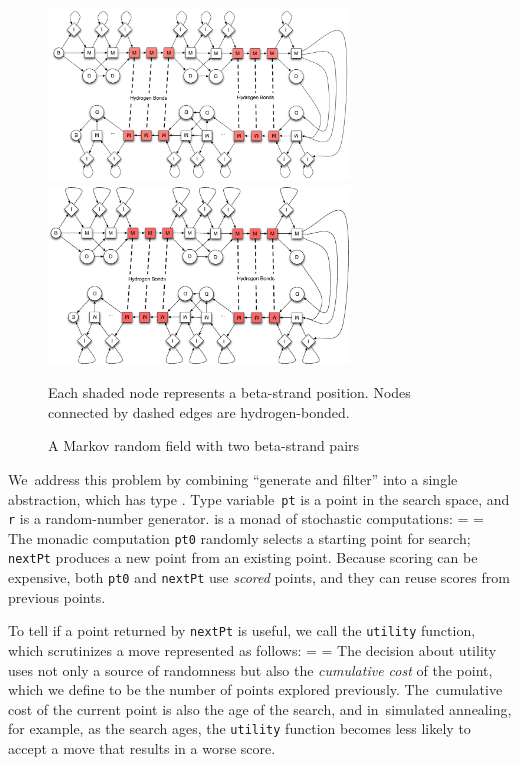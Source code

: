 \documentclass[nonatbib,preprint,blockstyle,times]{sigplanconf}
\newif\ifverbatimsmall
\newcommand\smallverbatiminput[1]{%
  \everypar=\expandafter{\the\everypar
       \verbatimsmallfalse
       \topsep=\standardvspace}%
  \topsep=0.78\topsep
  \verbatimsmalltrue}
\begin{document}
\begin{figure}
\ifpdfmadness
\centerline{\includegraphics[width=8cm]{mrf_interleave_diagram.pdf}} 
\else
\centerline{\includegraphics[width=8cm]{mrf_interleave_diagram.eps}} 
\fi
Each shaded node represents a beta-strand position.
Nodes connected by dashed edges are hydrogen-bonded.

\caption{A Markov random field with two beta-strand pairs}
\label{mrf} 
\end{figure}



We~address this problem by combining ``generate and filter'' into a
single abstraction, which has type .
Type variable~\texttt{pt} is a point in the search
space, and \texttt{r} is a
random-number generator.
 is a monad of stochastic computations:
\smallverbatiminput{gen.tex}
The monadic computation \texttt{pt0} randomly selects a starting point
for search;
\texttt{nextPt} produces a new point from
an existing point.
Because scoring can be expensive, both \texttt{pt0}
and \texttt{nextPt} use \emph{scored} points, and they can
reuse scores from previous points.

To tell if a point returned by \texttt{nextPt} is useful, we call
 the \texttt{utility} function,
which scrutinizes a move represented as follows:
\smallverbatiminput{move}
The decision about utility uses not only a source of randomness but
also the \emph{cumulative cost} of the point, which we define to be
the number of points explored previously.
The~cumulative cost of the current point is also the age of the
search,
and
in~simulated annealing, for example, as the search ages,
the \texttt{utility} function becomes less likely to accept a move
that results in a worse score.
\end{document}
